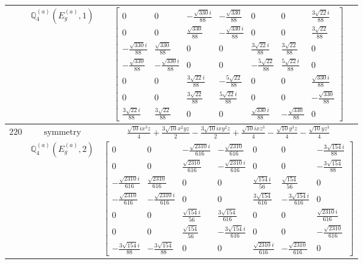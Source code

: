\documentclass[fleqn,8pt,landscape]{jsarticle}
\begin{document}
\begin{longtable}{ccc}
$  $ & $ \mathbb{Q}_{4}^{(a)}(E_{g}^{(a)},1) $ & $ \begin{bmatrix} 0 & 0 & - \frac{\sqrt{330} i}{88} & - \frac{\sqrt{330}}{88} & 0 & 0 & \frac{3 \sqrt{22} i}{88} \\ 0 & 0 & \frac{\sqrt{330}}{88} & - \frac{\sqrt{330} i}{88} & 0 & 0 & \frac{3 \sqrt{22}}{88} \\ - \frac{\sqrt{330} i}{88} & \frac{\sqrt{330}}{88} & 0 & 0 & \frac{3 \sqrt{22} i}{88} & \frac{3 \sqrt{22}}{88} & 0 \\ - \frac{\sqrt{330}}{88} & - \frac{\sqrt{330} i}{88} & 0 & 0 & - \frac{5 \sqrt{22}}{88} & \frac{5 \sqrt{22} i}{88} & 0 \\ 0 & 0 & \frac{3 \sqrt{22} i}{88} & - \frac{5 \sqrt{22}}{88} & 0 & 0 & \frac{\sqrt{330} i}{88} \\ 0 & 0 & \frac{3 \sqrt{22}}{88} & \frac{5 \sqrt{22} i}{88} & 0 & 0 & - \frac{\sqrt{330}}{88} \\ \frac{3 \sqrt{22} i}{88} & \frac{3 \sqrt{22}}{88} & 0 & 0 & \frac{\sqrt{330} i}{88} & - \frac{\sqrt{330}}{88} & 0 \end{bmatrix} $ \\ \hline
$ 220 $ & $ \text{symmetry} $ & $ \frac{\sqrt{10} i x^{3} z}{4} + \frac{3 \sqrt{10} x^{2} y z}{2} - \frac{3 \sqrt{10} i x y^{2} z}{2} + \frac{\sqrt{10} i x z^{3}}{4} - \frac{\sqrt{10} y^{3} z}{4} - \frac{\sqrt{10} y z^{3}}{4} $ \\
$  $ & $ \mathbb{Q}_{4}^{(a)}(E_{g}^{(a)},2) $ & $ \begin{bmatrix} 0 & 0 & - \frac{\sqrt{2310} i}{616} & - \frac{\sqrt{2310}}{616} & 0 & 0 & - \frac{3 \sqrt{154} i}{88} \\ 0 & 0 & \frac{\sqrt{2310}}{616} & - \frac{\sqrt{2310} i}{616} & 0 & 0 & - \frac{3 \sqrt{154}}{88} \\ - \frac{\sqrt{2310} i}{616} & \frac{\sqrt{2310}}{616} & 0 & 0 & \frac{\sqrt{154} i}{56} & \frac{\sqrt{154}}{56} & 0 \\ - \frac{\sqrt{2310}}{616} & - \frac{\sqrt{2310} i}{616} & 0 & 0 & \frac{3 \sqrt{154}}{616} & - \frac{3 \sqrt{154} i}{616} & 0 \\ 0 & 0 & \frac{\sqrt{154} i}{56} & \frac{3 \sqrt{154}}{616} & 0 & 0 & \frac{\sqrt{2310} i}{616} \\ 0 & 0 & \frac{\sqrt{154}}{56} & - \frac{3 \sqrt{154} i}{616} & 0 & 0 & - \frac{\sqrt{2310}}{616} \\ - \frac{3 \sqrt{154} i}{88} & - \frac{3 \sqrt{154}}{88} & 0 & 0 & \frac{\sqrt{2310} i}{616} & - \frac{\sqrt{2310}}{616} & 0 \end{bmatrix} $ \\ \hline

\end{longtable}
\end{document}
